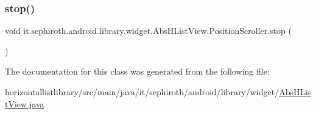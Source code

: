 \subsubsection{\texorpdfstring{stop()}{stop()}}
{\footnotesize\ttfamily void it.\+sephiroth.\+android.\+library.\+widget.\+Abs\+H\+List\+View.\+Position\+Scroller.\+stop (\begin{DoxyParamCaption}{ }\end{DoxyParamCaption})}



The documentation for this class was generated from the following file\+:\begin{DoxyCompactItemize}
\item 
horizontallistlibrary/src/main/java/it/sephiroth/android/library/widget/\hyperlink{_abs_h_list_view_8java}{Abs\+H\+List\+View.\+java}\end{DoxyCompactItemize}
